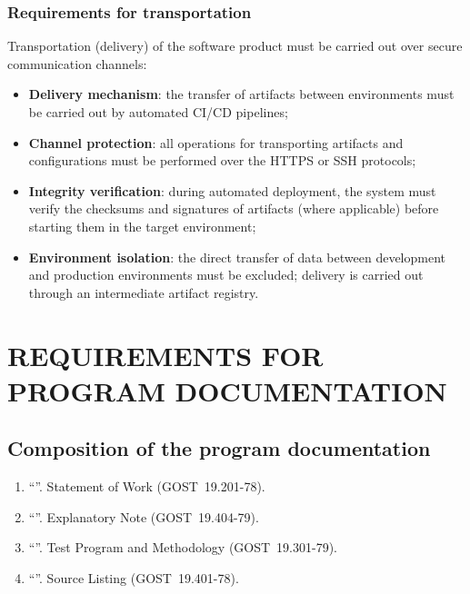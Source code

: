 \documentclass[12pt,a4paper]{extarticle}
\begin{document}
\subsubsection{Requirements for transportation}

\begin{hseExample}
Transportation (delivery) of the software product must be carried out over secure communication channels:
\begin{itemize}[nosep, leftmargin=1.25cm]
    \item \textbf{Delivery mechanism}: the transfer of artifacts between environments must be carried out by automated CI/CD pipelines;
    \item \textbf{Channel protection}: all operations for transporting artifacts and configurations must be performed over the HTTPS or SSH protocols;
    \item \textbf{Integrity verification}: during automated deployment, the system must verify the checksums and signatures of artifacts (where applicable) before starting them in the target environment;
    \item \textbf{Environment isolation}: the direct transfer of data between development and production environments must be excluded; delivery is carried out through an intermediate artifact registry.
\end{itemize}
\end{hseExample}

\clearpage

\section{REQUIREMENTS FOR PROGRAM DOCUMENTATION}

\subsection{Composition of the program documentation}
\label{sec:doc_composition}

\begin{enumerate}[label=\arabic*), leftmargin=1.25cm]
\item \enquote{\projectname}. Statement of Work (GOST~19.201-78).
\item \enquote{\projectname}. Explanatory Note (GOST~19.404-79).
\item \enquote{\projectname}. Test Program and Methodology (GOST~19.301-79).
\item \enquote{\projectname}. Source Listing (GOST~19.401-78).
\hseManualDocItems
\end{enumerate}
\end{document}
